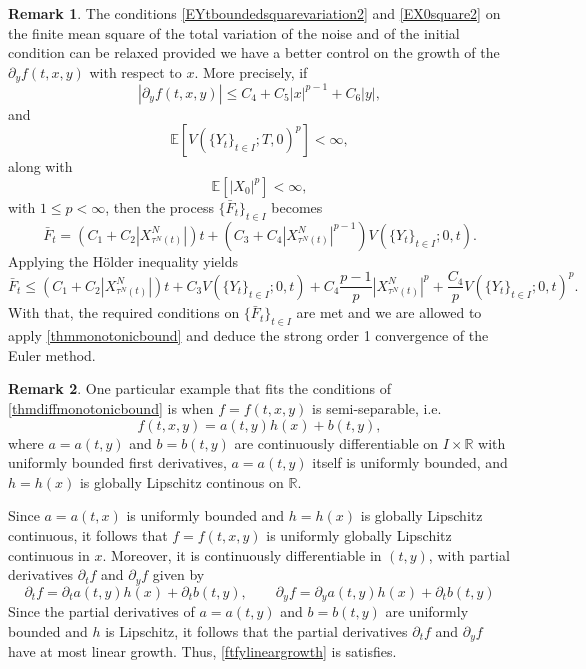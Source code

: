 \documentclass[reqno,12pt]{amsart}
\theoremstyle{plain}%
\theoremstyle{definition}
\newtheorem{rmk}{Remark}[section]
\begin{document}
\begin{rmk}
    The conditions \eqref{EYtboundedsquarevariation2} and \eqref{EX0square2} on the finite mean square of the total variation of the noise and of the initial condition can be relaxed provided we have a better control on the growth of the $\partial_y f(t, x, y)$ with respect to $x$. More precisely, if
    \[
        |\partial_y f(t, x, y)| \leq C_4 + C_5|x|^{p-1} + C_6|y|,
    \]
    and
    \[
        \mathbb{E}[V(\{Y_t\}_{t\in I}; T, 0)^p] < \infty,
    \]
    along with
    \[
        \mathbb{E}[|X_0|^p] < \infty,
    \]
    with $1 \leq p < \infty$, then the process $\{\bar F_t\}_{t\in I}$ becomes
    \[
        \bar F_t = (C_1 + C_2 |X_{\tau^N(t)}^N|)t + (C_3 + C_4 |X_{\tau^N(t)}^N|^{p-1}) V(\{Y_t\}_{t\in I}; 0, t).
    \]
    Applying the H\"older inequality yields
    \[
        \bar F_t \leq (C_1 + C_2 |X_{\tau^N(t)}^N|)t + C_3 V(\{Y_t\}_{t\in I}; 0, t) + C_4 \frac{p-1}{p}|X_{\tau^N(t)}^N|^p  + \frac{C_4}{p} V(\{Y_t\}_{t\in I}; 0, t)^p.
    \]
    With that, the required conditions on $\{\bar F_t\}_{t\in I}$ are met and we are allowed to apply \cref{thmmonotonicbound} and deduce the strong order 1 convergence of the Euler method.
\end{rmk}

\begin{rmk}
    One particular example that fits the conditions of \cref{thmdiffmonotonicbound} is when $f=f(t, x, y)$ is semi-separable, i.e.
    \begin{equation}
        \label{lineareqform}
        f(t, x, y) = a(t, y)h(x) + b(t, y),
    \end{equation}
    where $a=a(t, y)$ and $b=b(t, y)$ are continuously differentiable on $I\times \mathbb{R}$ with uniformly bounded first derivatives, $a=a(t, y)$ itself is uniformly bounded, and $h=h(x)$ is globally Lipschitz continous on $\mathbb{R}$.
    
    Since $a=a(t, x)$ is uniformly bounded and $h=h(x)$ is globally Lipschitz continuous, it follows that $f=f(t, x, y)$ is uniformly globally Lipschitz continuous in $x$. Moreover, it is continuously differentiable in $(t, y)$, with partial derivatives $\partial_t f$ and $\partial_y f$ given by
    \[
        \partial_t f = \partial_t a(t, y) h(x) + \partial_t b(t, y), \qquad \partial_y f = \partial_y a(t, y) h(x) + \partial_t b(t, y)
    \]
    Since the partial derivatives of $a=a(t, y)$ and $b=b(t, y)$ are uniformly bounded and $h$ is Lipschitz, it follows that the partial derivatives $\partial_t f$ and $\partial_y f$ have at most linear growth. Thus,  \eqref{ftfylineargrowth} is satisfies.
\end{rmk}
\end{document}
